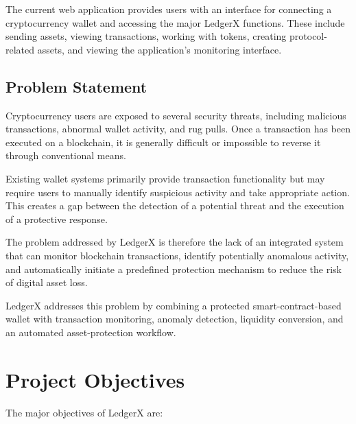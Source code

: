 \documentclass{tietreport}
\begin{document}
The current web application provides users with an interface for
connecting a cryptocurrency wallet and accessing the major LedgerX
functions. These include sending assets, viewing transactions,
working with tokens, creating protocol-related assets, and viewing
the application's monitoring interface.

\subsection{Problem Statement}

Cryptocurrency users are exposed to several security threats,
including malicious transactions, abnormal wallet activity, and rug
pulls. Once a transaction has been executed on a blockchain, it is
generally difficult or impossible to reverse it through conventional
means.

Existing wallet systems primarily provide transaction functionality
but may require users to manually identify suspicious activity and
take appropriate action. This creates a gap between the detection of
a potential threat and the execution of a protective response.

The problem addressed by LedgerX is therefore the lack of an
integrated system that can monitor blockchain transactions, identify
potentially anomalous activity, and automatically initiate a
predefined protection mechanism to reduce the risk of digital asset
loss.

LedgerX addresses this problem by combining a protected
smart-contract-based wallet with transaction monitoring, anomaly
detection, liquidity conversion, and an automated asset-protection
workflow.

\section{Project Objectives}

The major objectives of LedgerX are:
\end{document}
